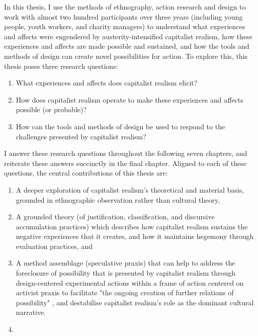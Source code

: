 In this thesis, I use the methods of ethnography, action research and design to work with almost two hundred participants over three years (including young people, youth workers, and charity managers) to understand what experiences and affects were engendered by austerity-intensified capitalist realism, how these experiences and affects are made possible and sustained, and how the tools and methods of design can create novel possibilities for action. To explore this, this thesis poses three research questions: 
\begin{enumerate}
    \item What experiences and affects does capitalist realism elicit?
    \item How does capitalist realism operate to make these experiences and affects possible (or probable)?
    \item How can the tools and methods of design be used to respond to the challenges presented by capitalist realism?
\end{enumerate}
I answer these research questions throughout the following seven chapters, and reiterate these answers succinctly in the final chapter. Aligned to each of these questions, the central contributions of this thesis are:
\begin{enumerate}
    \item A deeper exploration of capitalist realism's theoretical and material basis, grounded in ethnographic observation rather than cultural theory,
    \item A grounded theory (of justification, classification, and discursive accumulation practices) which describes how capitalist realism sustains the negative experiences that it creates, and how it maintains hegemony through evaluation practices, and
    \item A method assemblage (speculative praxis) that can help to address the foreclosure of possibility that is presented by capitalist realism through design-centered experimental actions within a frame of action centered on activist praxis to facilitate "the ongoing creation of further relations of possibility" \citep[p. 320]{harrison_future_2020}, and destabilise capitalist realism's role as the dominant cultural narrative. 
    \item \end{enumerate}

